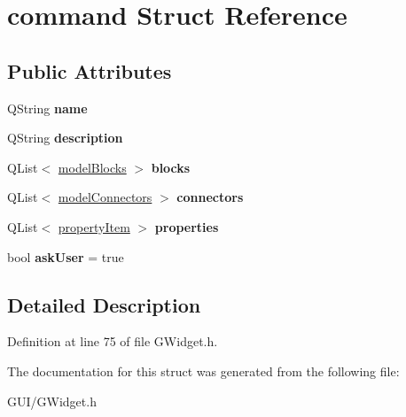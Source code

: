 \hypertarget{structcommand}{}\section{command Struct Reference}
\label{structcommand}
\subsection*{Public Attributes}
\begin{DoxyCompactItemize}
\item 
\mbox{\label{structcommand_aa6a9b4dfaa301c087423f99d8b08ecd8}} 
Q\+String {\bfseries name}
\item 
\mbox{\label{structcommand_ac413dfae64f49cad7752ea30ef0394fe}} 
Q\+String {\bfseries description}
\item 
\mbox{\label{structcommand_a2f6dd75a46354398424fb1674c66132e}} 
Q\+List$<$ \hyperlink{structmodel_blocks}{model\+Blocks} $>$ {\bfseries blocks}
\item 
\mbox{\label{structcommand_a074cf432cb46ea14c14880043b0ebb60}} 
Q\+List$<$ \hyperlink{structmodel_connectors}{model\+Connectors} $>$ {\bfseries connectors}
\item 
\mbox{\label{structcommand_a7f6840ee6e26cbfd1470ac0ede093034}} 
Q\+List$<$ \hyperlink{structproperty_item}{property\+Item} $>$ {\bfseries properties}
\item 
\mbox{\label{structcommand_ad8f5bd771e9725bf4b4b69bb1072e696}} 
bool {\bfseries ask\+User} = true
\end{DoxyCompactItemize}


\subsection{Detailed Description}


Definition at line 75 of file G\+Widget.\+h.



The documentation for this struct was generated from the following file\+:\begin{DoxyCompactItemize}
\item 
G\+U\+I/G\+Widget.\+h\end{DoxyCompactItemize}
